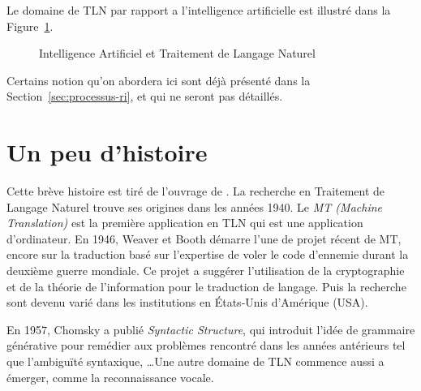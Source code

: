 Le domaine de TLN par rapport a l'intelligence artificielle est illustré dans la Figure~\ref{fig:nlp-ref-ai}.

\begin{figure}[htbp]
    \begin{center}
    \end{center}
    \caption{Intelligence Artificiel et Traitement de Langage Naturel \citep{devopedia-nlp}}\label{fig:nlp-ref-ai}
\end{figure}

Certains notion qu'on abordera ici sont déjà présenté dans la Section~\ref{sec:processus-ri}, et qui ne seront pas détaillés.

\section{Un peu d'histoire}
Cette brève histoire est tiré de l'ouvrage de \citeauthor{natural-language-processing} \citep{natural-language-processing}. La recherche en Traitement de Langage Naturel trouve ses origines dans les années 1940. Le \emph{MT (Machine Translation)} est la première application en TLN qui est une application d'ordinateur. En 1946, Weaver et Booth démarre l'une de projet récent de MT, encore sur la traduction basé sur l'expertise de voler le code d’ennemie durant la deuxième guerre mondiale. Ce projet a suggérer l'utilisation de la cryptographie et de la théorie de l'information pour le traduction de langage. Puis la recherche sont devenu varié dans les institutions en États-Unis d'Amérique (USA).

En 1957, Chomsky a publié \textit{Syntactic Structure}, qui introduit l'idée de grammaire générative pour remédier aux problèmes rencontré dans les années antérieurs tel que l’ambiguïté syntaxique, \dots Une autre domaine de TLN commence aussi a émerger, comme la reconnaissance vocale.

